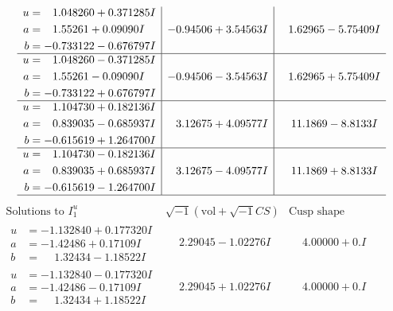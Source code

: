 \documentclass[1p]{elsarticle_modified}
\theoremstyle{definition}
\newcommand{\I}{\sqrt{-1}}
\begin{document}
$$\begin{array}{c|c|c}
\begin{aligned}
u &= \phantom{-}1.048260 + 0.371285 I \\
a &= \phantom{-}1.55261 + 0.09090 I \\
b &= -0.733122 - 0.676797 I\end{aligned}
 & -0.94506 + 3.54563 I & \phantom{-}1.62965 - 5.75409 I \\ \hline\begin{aligned}
u &= \phantom{-}1.048260 - 0.371285 I \\
a &= \phantom{-}1.55261 - 0.09090 I \\
b &= -0.733122 + 0.676797 I\end{aligned}
 & -0.94506 - 3.54563 I & \phantom{-}1.62965 + 5.75409 I \\ \hline\begin{aligned}
u &= \phantom{-}1.104730 + 0.182136 I \\
a &= \phantom{-}0.839035 - 0.685937 I \\
b &= -0.615619 + 1.264700 I\end{aligned}
 & \phantom{-}3.12675 + 4.09577 I & \phantom{-}11.1869 - 8.8133 I \\ \hline\begin{aligned}
u &= \phantom{-}1.104730 - 0.182136 I \\
a &= \phantom{-}0.839035 + 0.685937 I \\
b &= -0.615619 - 1.264700 I\end{aligned}
 & \phantom{-}3.12675 - 4.09577 I & \phantom{-}11.1869 + 8.8133 I\\
 \hline 
 \end{array}$$\newpage$$\begin{array}{c|c|c}  
\text{Solutions to }I^u_{1}& \I (\text{vol} + \sqrt{-1}CS) & \text{Cusp shape}\\
 \hline 
\begin{aligned}
u &= -1.132840 + 0.177320 I \\
a &= -1.42486 + 0.17109 I \\
b &= \phantom{-}1.32434 - 1.18522 I\end{aligned}
 & \phantom{-}2.29045 - 1.02276 I & \phantom{-}4.00000 + 0. I\phantom{ +0.000000I} \\ \hline\begin{aligned}
u &= -1.132840 - 0.177320 I \\
a &= -1.42486 - 0.17109 I \\
b &= \phantom{-}1.32434 + 1.18522 I\end{aligned}
 & \phantom{-}2.29045 + 1.02276 I & \phantom{-}4.00000 + 0. I\phantom{ +0.000000I} \\ \hline\begin{aligned}

\end{aligned}
\end{array}$$
\end{document}
